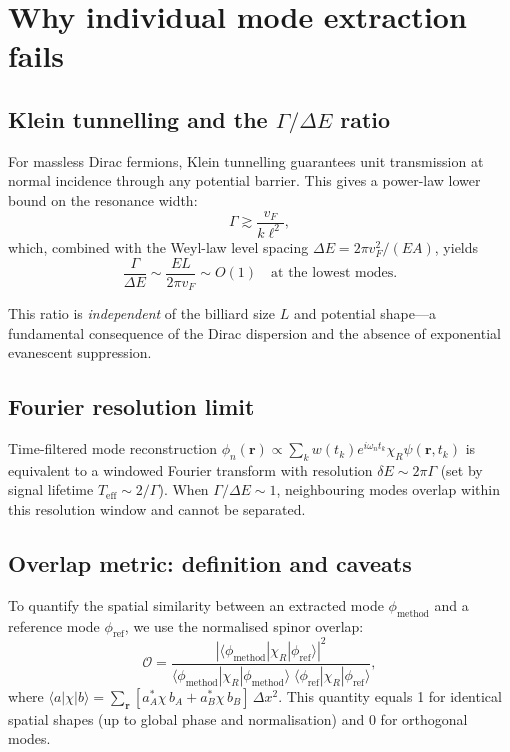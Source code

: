 \documentclass[11pt,a4paper]{article}
\newcommand{\vb}[1]{\mathbf{#1}}
\begin{document}
\section{Why individual mode extraction fails}
\label{sec:limits}

\subsection{Klein tunnelling and the $\Gamma/\Delta E$ ratio}

For massless Dirac fermions, Klein tunnelling guarantees unit
transmission at normal incidence through any potential barrier.
This gives a power-law lower bound on the resonance width:
\begin{equation}
  \Gamma \gtrsim \frac{v_F}{k\ell^2},
\end{equation}
which, combined with the Weyl-law level spacing
$\Delta E = 2\pi v_F^2/(EA)$, yields
\begin{equation}
  \frac{\Gamma}{\Delta E} \sim \frac{EL}{2\pi v_F} \sim O(1)
  \quad \text{at the lowest modes.}
\end{equation}

This ratio is \emph{independent} of the billiard size $L$ and
potential shape---a fundamental consequence of the Dirac dispersion
and the absence of exponential evanescent suppression.

\subsection{Fourier resolution limit}

Time-filtered mode reconstruction
$\phi_n(\vb{r}) \propto \sum_k w(t_k) e^{i\omega_n t_k} \chi_R \psi(\vb{r},t_k)$
is equivalent to a windowed Fourier transform with resolution
$\delta E \sim 2\pi\Gamma$ (set by signal lifetime $T_\text{eff} \sim 2/\Gamma$).
When $\Gamma/\Delta E \sim 1$, neighbouring modes overlap within
this resolution window and cannot be separated.

\subsection{Overlap metric: definition and caveats}

To quantify the spatial similarity between an extracted mode
$\phi_\text{method}$ and a reference mode $\phi_\text{ref}$, we use
the normalised spinor overlap:
\begin{equation}
  \mathcal{O} =
  \frac{|\langle\phi_\text{method}|\chi_R|\phi_\text{ref}\rangle|^2}
       {\langle\phi_\text{method}|\chi_R|\phi_\text{method}\rangle\;
        \langle\phi_\text{ref}|\chi_R|\phi_\text{ref}\rangle},
  \label{eq:overlap}
\end{equation}
where
$\langle a|\chi|b\rangle = \sum_{\vb{r}}
[a_A^*\chi\, b_A + a_B^*\chi\, b_B]\,\Delta x^2$.
This quantity equals 1 for identical spatial shapes (up to global
phase and normalisation) and 0 for orthogonal modes.
\end{document}
